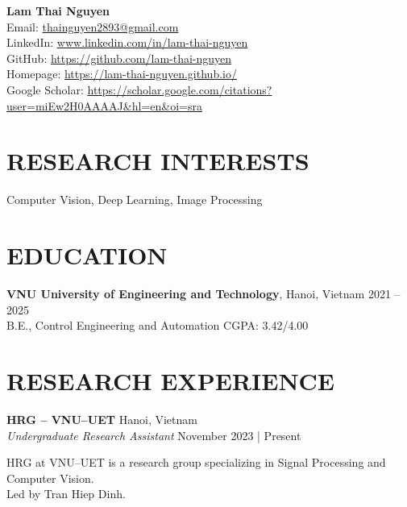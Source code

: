 \documentclass[a4paper,9pt]{extarticle}
\begin{document}
\pagestyle{fancy}
\renewcommand{\headrulewidth}{0pt}
\fancyhead{}
\fancyhead[R]{\textit{\today}}
\thispagestyle{empty} %

\begin{flushleft}
\textbf{\LARGE Lam Thai Nguyen}\\[2pt] %
Email: \href{mailto:thainguyen2893@gmail.com}{thainguyen2893@gmail.com} \\
LinkedIn: \href{https://www.linkedin.com/in/lam-thai-nguyen}{www.linkedin.com/in/lam-thai-nguyen} \\
GitHub: \href{https://github.com/lam-thai-nguyen}{https://github.com/lam-thai-nguyen}\\
Homepage: \href{https://lam-thai-nguyen.github.io/}{https://lam-thai-nguyen.github.io/} \\
Google Scholar: \href{https://scholar.google.com/citations?user=miEw2H0AAAAJ&hl=en&oi=sra}{https://scholar.google.com/citations?user=miEw2H0AAAAJ\&hl=en\&oi=sra} \\
\end{flushleft}

\section*{RESEARCH INTERESTS}
\noindent
Computer Vision, Deep Learning, Image Processing

\section*{EDUCATION}
\noindent
\textbf{VNU University of Engineering and Technology}, Hanoi, Vietnam \hfill 2021 -- 2025\\
B.E., Control Engineering and Automation \hfill CGPA: 3.42/4.00 

\section*{RESEARCH EXPERIENCE}
\noindent
\textbf{HRG -- VNU--UET} \hfill Hanoi, Vietnam  \\ %
\textit{Undergraduate Research Assistant} \hfill November 2023 | Present

\vspace{3pt}\noindent
HRG at VNU--UET is a research group specializing in Signal Processing and Computer Vision. \\ 
Led by Tran Hiep Dinh.
\end{document}
